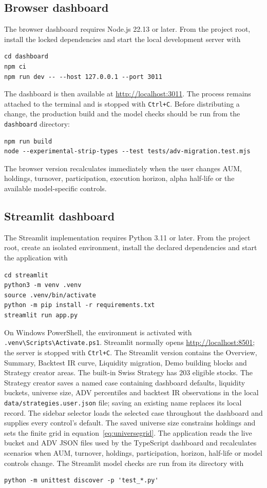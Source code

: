 \documentclass[11pt,a4paper]{article}
\numberwithin{equation}{section}
\begin{document}
\subsection{Browser dashboard}
The browser dashboard requires Node.js 22.13 or later. From the project root, install the locked
dependencies and start the local development server with
\begin{verbatim}
cd dashboard
npm ci
npm run dev -- --host 127.0.0.1 --port 3011
\end{verbatim}
The dashboard is then available at \url{http://localhost:3011}. The process remains attached to
the terminal and is stopped with \texttt{Ctrl+C}. Before distributing a change, the production
build and the model checks should be run from the \texttt{dashboard} directory:
\begin{verbatim}
npm run build
node --experimental-strip-types --test tests/adv-migration.test.mjs
\end{verbatim}
The browser version recalculates immediately when the user changes AUM, holdings, turnover,
participation, execution horizon, alpha half-life or the available model-specific controls.

\subsection{Streamlit dashboard}
\begin{sloppypar}
The Streamlit implementation requires Python 3.11 or later. From the project root, create an
isolated environment, install the declared dependencies and start the application with
\begin{verbatim}
cd streamlit
python3 -m venv .venv
source .venv/bin/activate
python -m pip install -r requirements.txt
streamlit run app.py
\end{verbatim}
On Windows PowerShell, the environment is activated with
\verb|.venv\Scripts\Activate.ps1|. Streamlit normally opens
\url{http://localhost:8501}; the server is stopped with \texttt{Ctrl+C}. The Streamlit version
contains the Overview, Summary, Backtest IR curve, Liquidity migration, Demo building blocks and
Strategy creator areas. The built-in Swiss Strategy has 203 eligible stocks. The Strategy creator saves a
named case containing dashboard defaults, liquidity buckets, universe size, ADV percentiles and
backtest IR observations in the
local \verb|data/strategies.user.json| file; saving an existing name replaces its local record.
The sidebar selector loads the selected case throughout the dashboard and supplies every control's
default. The saved universe size
constrains holdings and sets the finite grid in equation~\eqref{eq:universegrid}. The application reads
the live bucket and ADV JSON files used by the TypeScript dashboard and recalculates scenarios
when AUM, turnover, holdings, participation, horizon, half-life or model controls change.
The Streamlit model checks are run from its directory with
\begin{verbatim}
python -m unittest discover -p 'test_*.py'
\end{verbatim}
\end{sloppypar}
\end{document}
